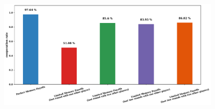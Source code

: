\documentclass[11pt]{article}
\theoremstyle{plainCl1}
\theoremstyle{plainCl2}
\begin{document}
\begin{figure}[!htbp]
  \centering
    \includegraphics[width=\textwidth]{static/more_memory.pdf}
\end{figure}



\end{document}

